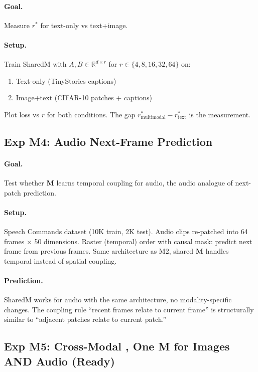 \documentclass[11pt, a4paper]{article}
\newcommand{\M}{\mathbf{M}}
\newcommand{\R}{\mathbb{R}}
\theoremstyle{plain}
\theoremstyle{remark}
\begin{document}
\paragraph{Goal.}
Measure $r^*$ for text-only vs text+image.

\paragraph{Setup.}
Train SharedM with $A, B \in \R^{d \times r}$ for $r \in \{4, 8, 16, 32, 64\}$ on:
\begin{enumerate}[nosep]
    \item Text-only (TinyStories captions)
    \item Image+text (CIFAR-10 patches + captions)
\end{enumerate}
Plot loss vs $r$ for both conditions.
The gap $r^*_{\text{multimodal}} - r^*_{\text{text}}$ is the measurement.

\subsection{Exp M4: Audio Next-Frame Prediction}

\paragraph{Goal.}
Test whether $\M$ learns temporal coupling for audio, the audio analogue of next-patch prediction.

\paragraph{Setup.}
Speech Commands dataset (10K train, 2K test).
Audio clips re-patched into 64 frames $\times$ 50 dimensions.
Raster (temporal) order with causal mask: predict next frame from previous frames.
Same architecture as M2, shared $\M$ handles temporal instead of spatial coupling.

\paragraph{Prediction.}
SharedM works for audio with the same architecture, no modality-specific changes.
The coupling rule ``recent frames relate to current frame'' is structurally similar to ``adjacent patches relate to current patch.''

\subsection{Exp M5: Cross-Modal ,  One M for Images AND Audio (Ready)}
\end{document}
